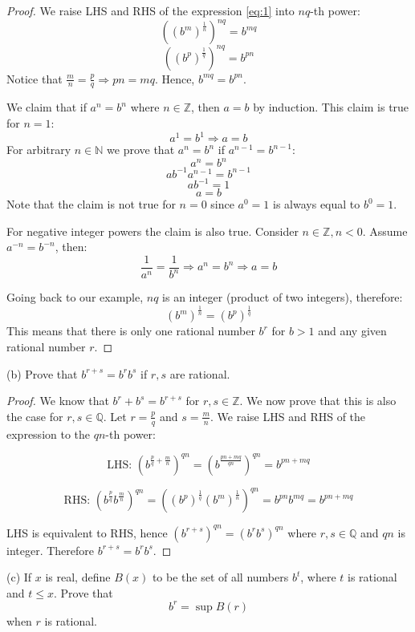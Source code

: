 \documentclass{article}
\begin{document}
\begin{proof}
We raise LHS and RHS of the expression \ref{eq:1} into $nq$-th power:
$$((b^m)^{\frac{1}{n}})^{nq} = b^{mq}$$
$$((b^p)^{\frac{1}{q}})^{nq} = b^{pn}$$
Notice that $\frac{m}{n}=\frac{p}{q} \Rightarrow pn = mq$. Hence, $b^{mq} = b^{pn}$.

We claim that if $a^n = b^n$ where $n \in \mathbb{Z}$, then $a=b$ by induction.
This claim is true for $n=1$:
$$a^1 = b^1 \Rightarrow a = b$$
For arbitrary $n \in \mathbb{N}$ we prove that $a^n = b^n$ if $a^{n-1} = b^{n-1}$:
$$a^n = b^n$$
$$ab^{-1}a^{n-1} = b^{n-1}$$
$$ab^{-1} = 1$$
$$a = b$$
Note that the claim is not true for $n=0$ since $a^0=1$ is always equal to $b^0=1$.

For negative integer powers the claim is also true. Consider $n \in \mathbb{Z}, n<0$. Assume $a^{-n} = b^{-n}$, then:
$$\frac{1}{a^n} = \frac{1}{b^n} \Rightarrow a^n = b^n \Rightarrow a=b$$

Going back to our example, $nq$ is an integer (product of two integers), therefore:
$$(b^m)^{\frac{1}{n}} = (b^p)^{\frac{1}{q}}$$
This means that there is only one rational number $b^r$ for $b>1$ and any given rational number $r$.
\end{proof}

\begin{tcolorbox}
(b) Prove that $b^{r+s} = b^r b^s$ if $r, s$ are rational.
\end{tcolorbox}

\begin{proof}
We know that $b^r+b^s = b^{r+s}$ for $r,s \in \mathbb{Z}$. We now prove that this is also the case for $r,s \in \mathbb{Q}$. Let $r=\frac{p}{q}$ and $s=\frac{m}{n}$. We raise LHS and RHS of the expression to the $qn$-th power:

$$\mbox{LHS: } (b^{\frac{p}{q}+\frac{m}{n}})^{qn} = (b^{\frac{pn+mq}{qn}})^{qn} = b^{pn+mq} $$

$$\mbox{RHS: } (b^{\frac{p}{q}}b^{\frac{m}{n}})^{qn}= ((b^p)^\frac{1}{q}(b^m)^\frac{1}{n})^{qn} = b^{pn} b^{mq} = b^{pn+mq}$$

LHS is equivalent to RHS, hence $(b^{r+s})^{qn} = (b^r b^s)^{qn} $ where $r, s \in \mathbb{Q}$ and $qn$ is integer. Therefore $b^{r+s} = b^r b^s$. 
\end{proof}

\begin{tcolorbox}
(c) If $x$ is real, define $B(x)$ to be the set of all numbers $b^t$, where $t$ is rational and $t \leq x$. Prove that
$$b^r = \sup B(r)$$
when $r$ is rational.
\end{tcolorbox}
\end{document}
